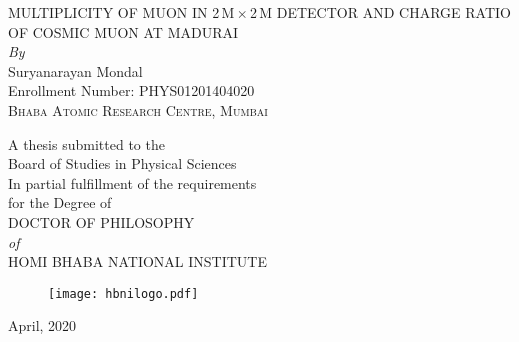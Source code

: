 \begin{center}

  \onehalfspacing
  
  \huge
  \vspace*{0.2em}
  \uppercase{Multiplicity of muon in 2\,m\,$\times$\,2\,m detector and charge ratio of cosmic muon at Madurai}\\
  
  \large
  \vspace*{3em}\textit{By}\\
  Suryanarayan Mondal\\
  Enrollment Number: PHYS01201404020\\
  
  \Large
  \vspace*{0.5em}
  \textsc{Bhaba Atomic Research Centre, Mumbai}
  
  \singlespacing
  \large

  \vspace*{1.em}
  A thesis submitted to the\\
  Board of Studies in Physical Sciences\\
  \vspace*{1em}
  In partial fulfillment of the requirements\\
  for the Degree of\\
  
  \doublespacing
  \vspace*{1em}
  \uppercase{Doctor of Philosophy}\\
  \textit{of}\\
  \uppercase{Homi Bhaba National Institute}
  
  \vspace*{1em}
  \begin{figure}[h!]
    \centering
    \texttt{[image: hbnilogo.pdf]}
  \end{figure}
  
  April, 2020

\end{center}
